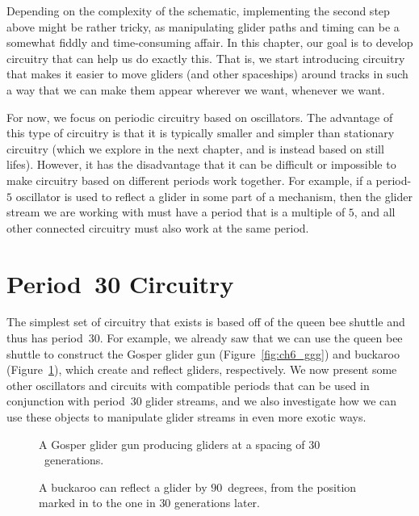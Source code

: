Depending on the complexity of the schematic, implementing the second step above might be rather tricky, as manipulating glider paths and timing can be a somewhat fiddly and time-consuming affair. In this chapter, our goal is to develop circuitry that can help us do exactly this. That is, we start introducing circuitry that makes it easier to move gliders (and other spaceships) around tracks in such a way that we can make them appear wherever we want, whenever we want.

For now, we focus on periodic circuitry based on oscillators. The advantage of this type of circuitry is that it is typically smaller and simpler than stationary circuitry (which we explore in the next chapter, and is instead based on still lifes). However, it has the disadvantage that it can be difficult or impossible to make circuitry based on different periods work together. For example, if a period-$5$ oscillator is used to reflect a glider in some part of a mechanism, then the glider stream we are working with must have a period that is a multiple of $5$, and all other connected circuitry must also work at the same period.


\section{Period~30 Circuitry}\label{sec:p30}

The simplest set of circuitry that exists is based off of the queen bee shuttle and thus has period~$30$. For example, we already saw that we can use the queen bee shuttle to construct the Gosper glider gun (Figure~\ref{fig:ch6_ggg}) and buckaroo (Figure~\ref{fig:buckaroo_reflect}), which create and reflect gliders, respectively. We now present some other oscillators and circuits with compatible periods that can be used in conjunction with period~$30$ glider streams, and we also investigate how we can use these objects to manipulate glider streams in even more exotic ways.


\begin{figure}[!htb]
	\centering
	\begin{minipage}[b]{0.48\textwidth}
		\centering
		\caption{A Gosper glider gun producing gliders at a spacing of $30$~generations.}\label{fig:ch6_ggg}
	\end{minipage}\hfill
	\begin{minipage}[b]{0.48\textwidth}
		\centering
		\caption{A buckaroo can reflect a glider by $90$~degrees, from the position marked in  to the one in  $30$ generations later.}\label{fig:buckaroo_reflect}
	\end{minipage}
\end{figure}


